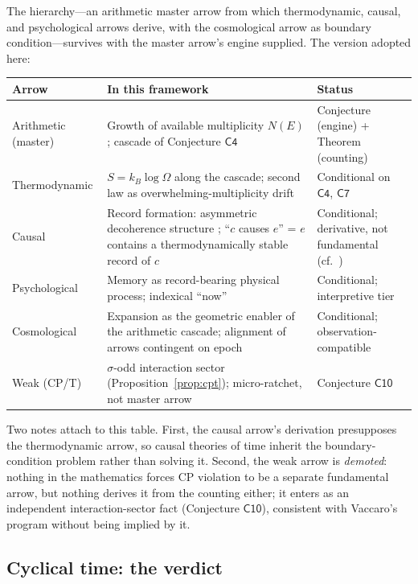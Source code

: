 \documentclass[11pt,a4paper]{article}
\theoremstyle{plain}
\theoremstyle{definition}
\theoremstyle{remark}
\begin{document}
The hierarchy---an arithmetic master arrow from which thermodynamic, causal, and
psychological arrows derive, with the cosmological arrow as boundary condition---survives
with the master arrow's engine supplied. The version adopted here:

\begin{center}
\begin{tabular}{@{}p{}p{}p{}@{}}
\toprule
Arrow & In this framework & Status\\
\midrule
Arithmetic (master) & Growth of available multiplicity $N(E)$; cascade of
Conjecture $\mathsf{C4}$ & Conjecture (engine) + Theorem (counting)\\
Thermodynamic & $S=k_{B}\log\Omega$ along the cascade; second law as
overwhelming-multiplicity drift & Conditional on $\mathsf{C4}$, $\mathsf{C7}$\\
Causal & Record formation: asymmetric decoherence structure
\cite{zurek2003,landauer1961}; ``$c$ causes $e$'' = $e$ contains a
thermodynamically stable record of $c$ & Conditional; derivative, not fundamental
(cf.\ \cite{malament1977,sorkin2003})\\
Psychological & Memory as record-bearing physical process; indexical ``now'' &
Conditional; interpretive tier\\
Cosmological & Expansion as the geometric enabler of the arithmetic cascade;
alignment of arrows contingent on epoch & Conditional; observation-compatible\\
Weak (CP/T) & $\sigma$-odd interaction sector (Proposition~\ref{prop:cpt});
micro-ratchet, not master arrow & Conjecture $\mathsf{C10}$\\
\bottomrule
\end{tabular}
\end{center}

Two notes attach to this table. First, the causal arrow's derivation presupposes the
thermodynamic arrow, so causal theories of time inherit the boundary-condition problem
rather than solving it. Second, the
weak arrow is \emph{demoted}: nothing in the
mathematics forces CP violation to be a separate fundamental arrow, but nothing derives it
from the counting either; it enters as an independent interaction-sector fact
(Conjecture $\mathsf{C10}$), consistent with Vaccaro's program \cite{vaccaro2016} without
being implied by it.

\subsection{Cyclical time: the verdict}
\end{document}
